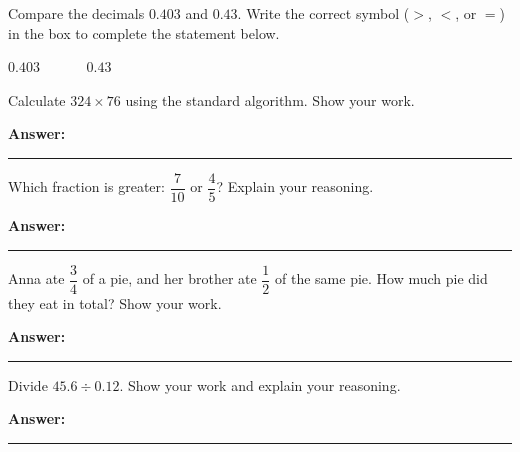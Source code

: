 \documentclass[12pt]{article}
\begin{document}
\begin{tcolorbox}[colframe=black!50, colback=white, title=\textbf{Problem 3}]
Compare the decimals \(0.403\) and \(0.43\). Write the correct symbol (\(>\), \(<\), or \(=\)) in the box to complete the statement below.

\begin{center}
    \Large
    \(0.403 \quad \boxed{\phantom{>}} \quad 0.43\)
\end{center}

\vspace{1cm}
\end{tcolorbox}

\begin{tcolorbox}[colframe=black!50, colback=white, title=\textbf{Problem 4}]
Calculate \(324 \times 76\) using the standard algorithm. Show your work.

\vspace{3.5cm}
\textbf{Answer:} \rule{0.5\textwidth}{0.4mm}
\end{tcolorbox}

\begin{tcolorbox}[colframe=black!50, colback=white, title=\textbf{Problem 5}]
Which fraction is greater: \( \dfrac{7}{10} \) or \( \dfrac{4}{5} \)? Explain your reasoning.

\vspace{3cm}
\textbf{Answer:} \rule{0.5\textwidth}{0.4mm}
\end{tcolorbox}

\begin{tcolorbox}[colframe=black!50, colback=white, title=\textbf{Problem 6}]
Anna ate \( \dfrac{3}{4} \) of a pie, and her brother ate \( \dfrac{1}{2} \) of the same pie. How much pie did they eat in total? Show your work.

\vspace{3cm}
\textbf{Answer:} \rule{0.5\textwidth}{0.4mm}
\end{tcolorbox}

\begin{tcolorbox}[colframe=black!50, colback=white, title=\textbf{Problem 7}]
Divide \(45.6 \div 0.12\). Show your work and explain your reasoning.

\vspace{3cm}
\textbf{Answer:} \rule{0.5\textwidth}{0.4mm}
\end{tcolorbox}
\end{document}
